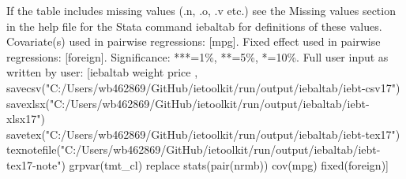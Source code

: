 If the table includes missing values (.n, .o, .v etc.) see the Missing values section in the help file for the Stata command iebaltab for definitions of these values. Covariate(s) used in pairwise regressions: [mpg]. Fixed effect used in pairwise regressions: [foreign]. Significance: ***=1\%, **=5\%, *=10\%. Full user input as written by user: [iebaltab weight price , savecsv("C:/Users/wb462869/GitHub/ietoolkit/run/output/iebaltab/iebt-csv17") savexlsx("C:/Users/wb462869/GitHub/ietoolkit/run/output/iebaltab/iebt-xlsx17") savetex("C:/Users/wb462869/GitHub/ietoolkit/run/output/iebaltab/iebt-tex17") texnotefile("C:/Users/wb462869/GitHub/ietoolkit/run/output/iebaltab/iebt-tex17-note") grpvar(tmt\_cl) replace stats(pair(nrmb)) cov(mpg) fixed(foreign)]
